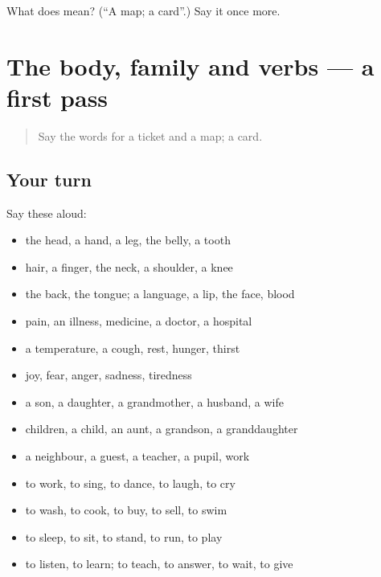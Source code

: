 \begin{tcolorbox}[breakable,colback=teal!4,colframe=teal!35!black,title={Before you move on}]
What does  mean? (\textquotedblleft{}A map; a card\textquotedblright{}.) Say it once more.
\end{tcolorbox}
\section[(dialogue)]{The body, family and verbs — a first pass}

\label{lesson:RU-R54-first-pass-the-body-family-and-verbs}



\begin{quote}
Say the words for a ticket and a map; a card.
\end{quote}

\subsection*{Your turn}
Say these aloud:

\begin{itemize}
\raggedright
  \item the head, a hand, a leg, the belly, a tooth
  \item hair, a finger, the neck, a shoulder, a knee
  \item the back, the tongue; a language, a lip, the face, blood
  \item pain, an illness, medicine, a doctor, a hospital
  \item a temperature, a cough, rest, hunger, thirst
  \item joy, fear, anger, sadness, tiredness
  \item a son, a daughter, a grandmother, a husband, a wife
  \item children, a child, an aunt, a grandson, a granddaughter
  \item a neighbour, a guest, a teacher, a pupil, work
  \item to work, to sing, to dance, to laugh, to cry
  \item to wash, to cook, to buy, to sell, to swim
  \item to sleep, to sit, to stand, to run, to play
  \item to listen, to learn; to teach, to answer, to wait, to give
\end{itemize}

